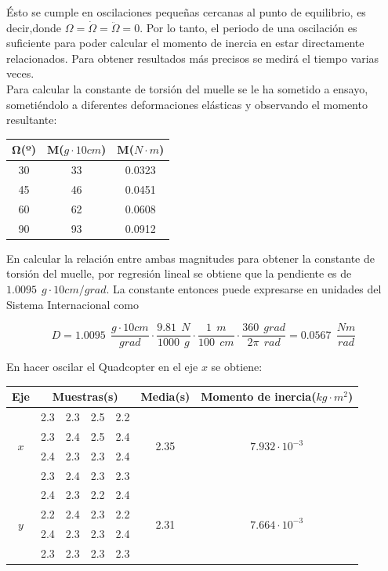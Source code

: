 \documentclass[twoside,11pt]{book}
\begin{document}
Ésto se cumple en oscilaciones pequeñas cercanas al punto de equilibrio, es decir,donde $\Omega=\dot{\Omega}=\ddot{\Omega}=0$. Por lo tanto, el periodo de una oscilación es suficiente para poder calcular el momento de inercia en estar directamente relacionados. Para obtener resultados más precisos se medirá el tiempo varias veces. \\

Para calcular la constante de torsión del muelle se le ha sometido a ensayo, sometiéndolo a diferentes deformaciones elásticas y observando el momento resultante:
\begin{center}
\begin{tabular}{|c|c|c|}
\hline
$\mathbf{\Omega}$(º) & $\mathbf{M}$($g \cdot 10cm$) & $\mathbf{M}$($N \cdot m$) \\
\hline 
\hline 
30 & 33 & 0.0323 \\
45 & 46 & 0.0451 \\
60 & 62 & 0.0608 \\
90 & 93 & 0.0912 \\
\hline 
\end{tabular}
\end{center}

En calcular la relación entre ambas magnitudes para obtener la constante de torsión del muelle, por regresión lineal se obtiene que la pendiente es de $1.0095\>\>g\cdot10cm/grad$. La constante entonces puede expresarse en unidades del Sistema Internacional como 

\begin{equation}
D=1.0095 \>\> \frac{g\cdot10cm}{grad}\cdot\frac{9.81 \>\> N}{1000 \>\> g} \cdot \frac{1 \>\> m}{100 \>\> cm} \cdot \frac{360 \>\> grad}{2\pi \>\> rad} = 0.0567 \>\> \frac{Nm}{rad}
\end{equation}

En hacer oscilar el Quadcopter en el eje $x$ se obtiene:

\begin{center}
\begin{tabular}{|c|cccc|c|c|}
\hline
\textbf{Eje} & \multicolumn{4}{c|}{\textbf{Muestras}(s)} & \textbf{Media}(s) & \textbf{Momento de inercia}($kg \cdot m^{2}$) \\
\hline
\multirow{4}{*}{$x$} & 2.3 & 2.3 & 2.5 & 2.2 & \multirow{4}{*}{2.35} & \multirow{4}{*}{$7.932\cdot 10^{-3}$} \\
& 2.3 & 2.4 & 2.5 & 2.4 & & \\
& 2.4 & 2.3 & 2.3 & 2.4 & & \\
& 2.3 & 2.4 & 2.3 & 2.3 & & \\
\hline
\multirow{4}{*}{$y$} & 2.4 & 2.3 & 2.2 & 2.4 & \multirow{4}{*}{2.31} & \multirow{4}{*}{$7.664\cdot 10^{-3}$} \\
& 2.2 & 2.4 & 2.3 & 2.2 & & \\
& 2.4 & 2.3 & 2.3 & 2.4 & & \\
& 2.3 & 2.3 & 2.3 & 2.3 & & \\
\hline
\end{tabular}
\end{center}
\end{document}
